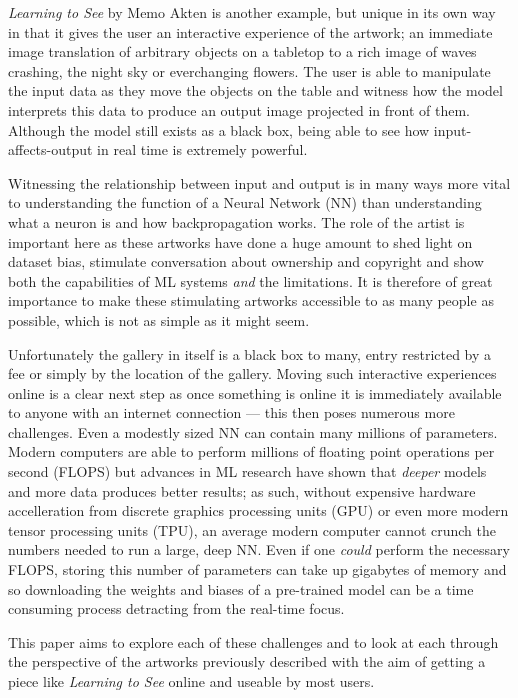 \documentclass{article}
\begin{document}
\textit{Learning to See} by Memo Akten\cite{lts_memo} is another example, but unique in its own way in that it gives the user an interactive experience of the artwork; an immediate image translation of arbitrary objects on a tabletop to a rich image of waves crashing, the night sky or everchanging flowers. The user is able to manipulate the input data as they move the objects on the table and witness how the model interprets this data to produce an output image projected in front of them. Although the model still exists as a black box, being able to see how input-affects-output in real time is extremely powerful.


Witnessing the relationship between input and output is in many ways more vital to understanding the function of a Neural Network (NN) than understanding what a neuron is and how backpropagation works. The role of the artist is important here as these artworks have done a huge amount to shed light on dataset bias\cite{crawford_paglen_2019}, stimulate conversation about ownership and copyright\cite{romano_2016} and show both the capabilities of ML systems \textit{and} the limitations. It is therefore of great importance to make these stimulating artworks accessible to as many people as possible, which is not as simple as it might seem.

Unfortunately the gallery in itself is a black box to many, entry restricted by a fee or simply by the location of the gallery. Moving such interactive experiences online is a clear next step as once something is online it is immediately available to anyone with an internet connection --- this then poses numerous more challenges. Even a modestly sized NN can contain many millions of parameters. Modern computers are able to perform millions of floating point operations per second (FLOPS) but advances in ML research have shown that \textit{deeper} models and more data produces better results\cite{2005.14165}; as such, without expensive hardware accelleration from discrete graphics processing units (GPU) or even more modern tensor processing units (TPU), an average modern computer cannot crunch the numbers needed to run a large, deep NN\@. Even if one \textit{could} perform the necessary FLOPS, storing this number of parameters can take up gigabytes of memory and so downloading the weights and biases of a pre-trained model can be a time consuming process detracting from the real-time focus.

This paper aims to explore each of these challenges and to look at each through the perspective of the artworks previously described with the aim of getting a piece like \textit{Learning to See} online and useable by most users.
\end{document}
